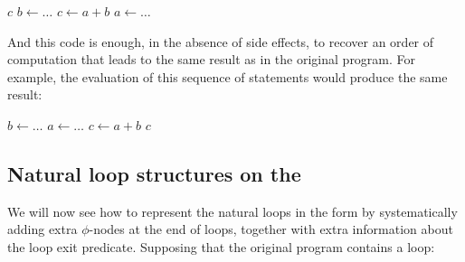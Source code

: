 {\begin{algorithm}[H]
\Return $c$\;
$b \gets \ldots$ 
$c \gets a + b$\;
$a \gets \ldots$ 
\end{algorithm}


\noindent
And this \SSA{} code is enough, in the absence of side effects, to
recover an order of computation that leads to the same result as in
the original program.  For example, the evaluation of this sequence of
statements would produce the same result:


\begin{algorithm}[H]
$b \gets \ldots$ 
$a \gets \ldots$ 
$c \gets a + b$\;
\Return $c$\;
\end{algorithm}



\subsection{Natural loop structures on the \SSA{}}
We will now see how to represent the natural loops in the \SSA{} form
by systematically adding extra $\phi$-nodes at the end of loops, together
with extra information about the loop exit predicate.
%
Supposing that the original program contains a loop:

}

